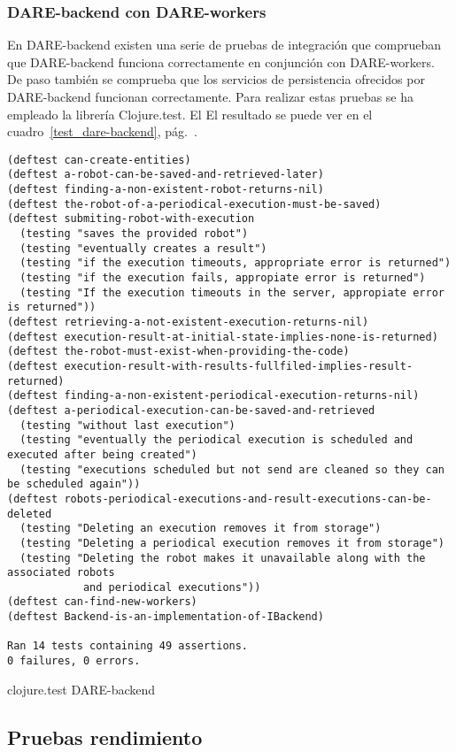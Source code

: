 \subsubsection{DARE-backend con DARE-workers}
En DARE-backend existen una serie de pruebas de integración que
comprueban que DARE-backend funciona correctamente en conjunción con
DARE-workers. De paso también se comprueba que los servicios de
persistencia ofrecidos por DARE-backend funcionan correctamente. Para
realizar estas pruebas se ha empleado la librería Clojure.test. El El
resultado se puede ver en el cuadro~\ref{test_dare-backend},
pág.~\pageref{test_dare-backend}.

\begin{table}[hbp]
\begingroup
  \fontsize{9pt}{11pt}\selectfont
\begin{verbatim}
(deftest can-create-entities)
(deftest a-robot-can-be-saved-and-retrieved-later)
(deftest finding-a-non-existent-robot-returns-nil)
(deftest the-robot-of-a-periodical-execution-must-be-saved)
(deftest submiting-robot-with-execution
  (testing "saves the provided robot")
  (testing "eventually creates a result")
  (testing "if the execution timeouts, appropriate error is returned")
  (testing "if the execution fails, appropiate error is returned")
  (testing "If the execution timeouts in the server, appropiate error is returned"))
(deftest retrieving-a-not-existent-execution-returns-nil)
(deftest execution-result-at-initial-state-implies-none-is-returned)
(deftest the-robot-must-exist-when-providing-the-code)
(deftest execution-result-with-results-fullfiled-implies-result-returned)
(deftest finding-a-non-existent-periodical-execution-returns-nil)
(deftest a-periodical-execution-can-be-saved-and-retrieved
  (testing "without last execution")
  (testing "eventually the periodical execution is scheduled and executed after being created")
  (testing "executions scheduled but not send are cleaned so they can be scheduled again"))
(deftest robots-periodical-executions-and-result-executions-can-be-deleted
  (testing "Deleting an execution removes it from storage")
  (testing "Deleting a periodical execution removes it from storage")
  (testing "Deleting the robot makes it unavailable along with the associated robots
            and periodical executions"))
(deftest can-find-new-workers)
(deftest Backend-is-an-implementation-of-IBackend)

Ran 14 tests containing 49 assertions.
0 failures, 0 errors.
\end{verbatim}
\endgroup
\caption{clojure.test DARE-backend}
\label{test_dare-backend}
\end{table}

\subsection{Pruebas rendimiento}
